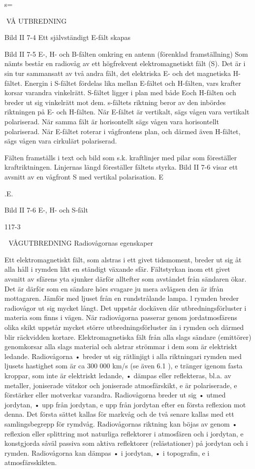 \documentclass[a4paper,twoside,twocolumn,openright]{book}
\begin{document}
{{{{{{s=

VÅ UTBREDNING

Bild II 7-4 Ett självständigt E-fält skapas

Bild II 7-5 E-, H- och B-fälten omkring en antenn (förenklad framställning)
Som nämts består en radiovåg av ett högfrekvent elektromagnetiskt fält (S). Det är i
sin tur sammansatt av två andra fält, det
elektriska E- och det magnetiska H-fältet.
Energin i S-fältet fördelas lika mellan E-fältet
och H-fälten, vars krafter korsar varandra
vinkelrätt. S-fältet ligger i plan med både Eoch H-fälten och breder ut sig vinkelrätt mot
dem. s-fältets riktning beror av den inbördes
riktningen på E- och H-fälten.
När E-fältet är vertikalt, sägs vågen vara
vertikalt polariserad. När samma fält är horisontellt sägs vågen vara horisontellt polariserad. När E-fältet roterar i vågfrontens
plan, och därmed även H-fältet, sägs vågen
vara cirkulärt polariserad.

Fälten framställs i text och bild som s.k.
kraftlinjer med pilar som föreställer kraftriktningen. Linjernas längd föreställer fältets
styrka. Bild II 7-6 visar ett avsnitt av en
vågfront S med vertikal polarisation.
E

.E.

Bild II 7-6 E-, H- och S-fält

117-3


VÅGUTBREDNING
Radiovågornas egenskaper

Ett elektromagnetiskt fält, som alstras i ett
givet tidsmoment, breder ut sig åt alla håll i
rymden likt en ständigt växande sfär.
Fältstyrkan inom ett givet avsnitt av sfärens yta sjunker därför alltefter som avståndet från sändaren ökar. Det är därför som en
sändare hörs svagare ju mera avlägsen den
är ifrån mottagaren. Jämför med ljuset från
en rundstrålande lampa.
l rymden breder radiovågor ut sig mycket
långt. Det uppstår dockäven där utbredningsförluster i materia som finns i vägen.
När radiovågorna passerar genom jordatmosfärens olika skikt uppstår mycket större
utbredningsförluster än i rymden och därmed blir räckvidden kortare.
Elektromagnetiska fält från alla slags sändare (emittörer) genomkorsar alla slags material och alstrar strömmar i dem som är
elektriskt ledande.
Radiovågorna
• breder ut sig rätlinjigt i alla riktningari rymden med ljusets hastighet som är ca
300 000 km/s (se även 6.1 ),
e
tränger igenom fasta kroppar, som inte är
elektriskt ledande,
• dämpas eller reflekteras, bl.a. av metaller, joniserade vätskor och joniserade
atmosfärskikt,
e
är polariserade,
e
förstärker eller motverkar varandra.
Radiovågorna breder ut sig
• utmed jordytan,
• upp från jordytan,
e
upp från jordytan efter en första reflexion
mot denna.
Det första sättet kallas för markvåg och
de två senare kallas med ett samlingsbegrepp för rymdvåg.
Radiovågornas riktning kan böjas av genom
• reflexion eller splittring mot naturliga
reflektorer i atmosfären och i jordytan,
e
konstgjorda såväl passiva som aktiva
reflektorer (relästationer) på jordytan och
i rymden.
Radiovågorna kan dämpas
• i jordytan,
• i topografin,
e
i atmosfärsskikten.

}}}}}}
\end{document}
